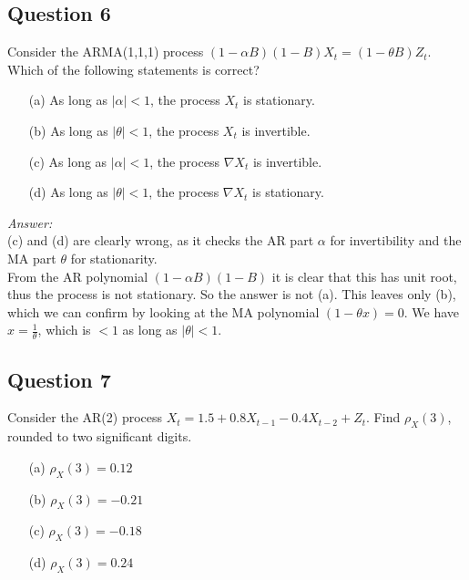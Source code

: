 \subsection*{Question 6}

Consider the ARMA(1,1,1) process $(1-\alpha B)(1-B)X_t = (1-\theta B)Z_t$. Which of the following statements is correct?

\begin{itemize}
    \item[(a)] As long as $|\alpha|<1$, the process $X_t$ is stationary.
    \item[(b)] As long as $|\theta|<1$, the process $X_t$ is invertible.
    \item[(c)] As long as $|\alpha|<1$, the process $\nabla X_t$ is invertible.
    \item[(d)] As long as $|\theta|<1$, the process $\nabla X_t$ is stationary.
\end{itemize}

\begin{footnotesize}
    \textit{Answer:} \\
    (c) and (d) are clearly wrong, as it checks the AR part $\alpha$ for invertibility and the MA part $\theta$ for stationarity. \\

    From the AR polynomial $(1-\alpha B)(1-B)$ it is clear that this has unit root, thus the process is not stationary. So the answer is not (a). This leaves only (b), which we can confirm by looking at the MA polynomial $(1-\theta x) = 0$. We have $x= \frac{1}{\theta}$, which is $<1$ as long as $|\theta| < 1$.
\end{footnotesize}

\subsection*{Question 7}

Consider the AR(2) process $X_t = 1.5 + 0.8X_{t-1}- 0.4 X_{t-2} + Z_t$. Find $\rho_X(3)$, rounded to two significant digits.

\begin{itemize}
    \item[(a)] $\rho_X(3)=0.12$
    \item[(b)] $\rho_X(3)=-0.21$
    \item[(c)] $\rho_X(3)=-0.18$
    \item[(d)] $\rho_X(3)=0.24$
\end{itemize}

